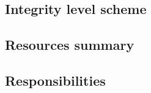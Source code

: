 \subsection{Integrity level scheme} \label{s:introduction:integrity-level-scheme}
	\begin{comment}
		$<$Describe the identified integrity level scheme for the software-based system or software product, and the mapping of the selected scheme to the integrity level scheme used in this standard. If the selected integrity level scheme is the example presented in this standard, it may be referenced and does not need to be repeated in the MTP. The MTP documents the assignment of integrity levels to individual components (e.g., requirements, functions, software modules, subsystems, non-functional characteristics, or other partitions), where there are differing integrity levels assigned within the system. At the beginning of each process, the assignment of integrity levels is reassessed with respect to changes that may need to be made in the integrity levels as a result of architecture selection, design choices, code construction, or other development activities. $>$
	\end{comment}

\subsection{Resources summary} \label{s:introduction:resources-summary}
	\begin{comment}
		$<$Summarize the test resources, including staffing, facilities, tools, and special procedural requirements (e.g., security, access rights, and documentation control). $>$
	\end{comment}

\subsection{Responsibilities} \label{s:introduction:resposibilities}
	\begin{comment}
		$<$Provide an overview of the organizational content topic(s) and responsibilities for testing tasks. Identify organizational components and their primary (they are the task leader) and secondary (they are not the leader, but providing support) test-related responsibilities. $>$
	\end{comment}

